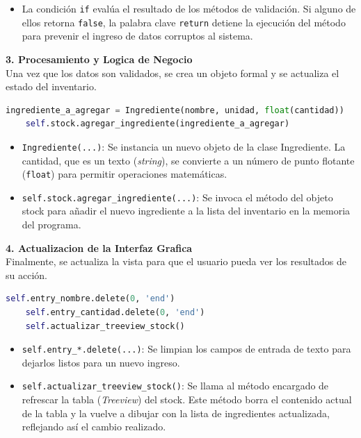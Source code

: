 \documentclass[a4paper,12pt]{article}
\begin{document}
\begin{itemize} \item La condición \verb|if| evalúa el resultado de los métodos de validación. Si alguno de ellos retorna \verb|false|, la palabra clave \verb|return| detiene la ejecución del método para prevenir el ingreso de datos corruptos al sistema. \end{itemize}

\newpage
\textbf{3. Procesamiento y Logica de Negocio}\\
Una vez que los datos son validados, se crea un objeto formal y se actualiza el estado del inventario.

\begin{lstlisting}[language=Python, caption={desenglosando codigo}, frame=single]
    ingrediente_a_agregar = Ingrediente(nombre, unidad, float(cantidad))
    self.stock.agregar_ingrediente(ingrediente_a_agregar)
\end{lstlisting}
\begin{itemize} 
\item \verb|Ingrediente(...)|: Se instancia un nuevo objeto de la clase Ingrediente. La cantidad, que es un texto (\textit{string}), se convierte a un número de punto flotante (\verb|float|) para permitir operaciones matemáticas. 
\item \verb|self.stock.agregar_ingrediente(...)|: Se invoca el método del objeto stock para añadir el nuevo ingrediente a la lista del inventario en la memoria del programa. 
\end{itemize}

\textbf{4. Actualizacion de la Interfaz Grafica}\\
Finalmente, se actualiza la vista para que el usuario pueda ver los resultados de su acción.

\begin{lstlisting}[language=Python, caption={desenglosando codigo}, frame=single]
    self.entry_nombre.delete(0, 'end')
    self.entry_cantidad.delete(0, 'end')
    self.actualizar_treeview_stock()
\end{lstlisting}

\begin{itemize} 
\item \verb|self.entry_*.delete(...)|: Se limpian los campos de entrada de texto para dejarlos listos para un nuevo ingreso. 
\item \verb|self.actualizar_treeview_stock()|: Se llama al método encargado de refrescar la tabla (\textit{Treeview}) del stock. Este método borra el contenido actual de la tabla y la vuelve a dibujar con la lista de ingredientes actualizada, reflejando así el cambio realizado. 
\end{itemize}
\end{document}
